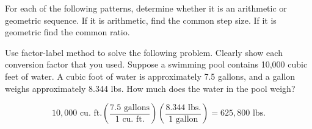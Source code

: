 \documentclass[11pt]{exam}
\begin{document}
\begin{questions}

\question For each of the following patterns, determine whether it is an arithmetic or geometric sequence. If it is arithmetic, find the common step size.  If it is geometric find the common ratio. 

\question Use factor-label method to solve the following problem.  Clearly show each conversion factor that you used. 
Suppose a swimming pool contains 10,000 cubic feet of water.  A cubic foot of water is approximately 7.5 gallons, and a gallon weighs approximately 8.344 lbs. How much does the water in the pool weigh?  
\begin{solution}
$$10{,}000 \text{ cu. ft.} \left( \frac{7.5 \text{ gallons}}{1 \text{ cu. ft.}} \right) \left( \frac{8.344 \text{ lbs.}}{1 \text{ gallon}} \right)  = 625{,}800 \text{ lbs.}$$
\end{solution}
\vfill
\vfill



\end{questions}
\end{document}
